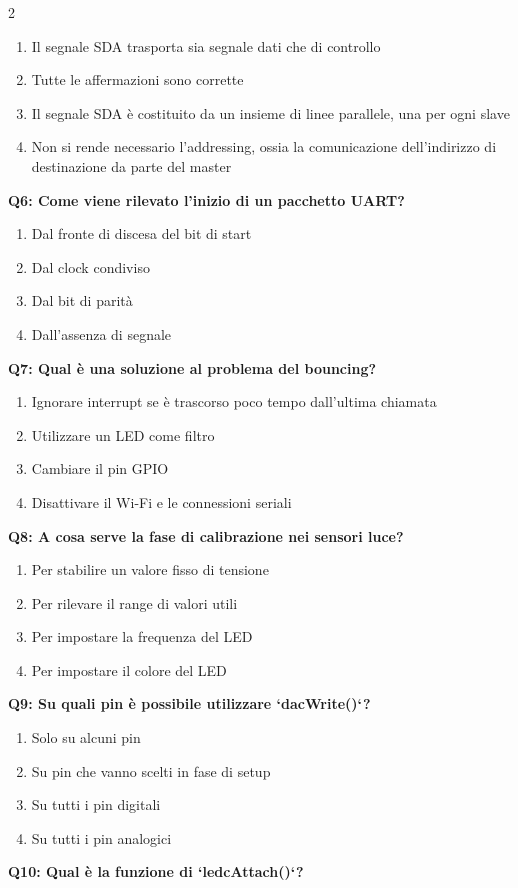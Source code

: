 \documentclass[10pt]{article}
\begin{document}
\begin{multicols}{2}
\begin{enumerate}[label=\arabic*.]
\item Il segnale SDA trasporta sia segnale dati che di controllo
\item Tutte le affermazioni sono corrette
\item Il segnale SDA è costituito da un insieme di linee parallele, una per ogni slave
\item Non si rende necessario l'addressing, ossia la comunicazione dell'indirizzo di destinazione da parte del master
\end{enumerate}
\textbf{Q6: Come viene rilevato l’inizio di un pacchetto UART?}

\begin{enumerate}[label=\arabic*.]
\item Dal fronte di discesa del bit di start
\item Dal clock condiviso
\item Dal bit di parità
\item Dall’assenza di segnale
\end{enumerate}
\textbf{Q7: Qual è una soluzione al problema del bouncing?}

\begin{enumerate}[label=\arabic*.]
\item Ignorare interrupt se è trascorso poco tempo dall'ultima chiamata
\item Utilizzare un LED come filtro
\item Cambiare il pin GPIO
\item Disattivare il Wi-Fi e le connessioni seriali
\end{enumerate}
\textbf{Q8: A cosa serve la fase di calibrazione nei sensori luce?}

\begin{enumerate}[label=\arabic*.]
\item Per stabilire un valore fisso di tensione
\item Per rilevare il range di valori utili
\item Per impostare la frequenza del LED
\item Per impostare il colore del LED
\end{enumerate}
\textbf{Q9: Su quali pin è possibile utilizzare `dacWrite()`?}

\begin{enumerate}[label=\arabic*.]
\item Solo su alcuni pin
\item Su pin che vanno scelti in fase di setup
\item Su tutti i pin digitali
\item Su tutti i pin analogici
\end{enumerate}
\textbf{Q10: Qual è la funzione di `ledcAttach()`?}


\end{multicols}
\end{document}
